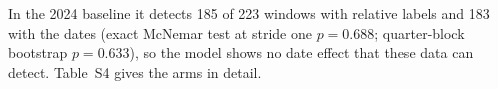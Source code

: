 In the 2024 baseline it detects 185 of 223 windows with relative labels and 183 with the dates (exact McNemar test at stride one $p=0.688$; quarter-block bootstrap $p=0.633$), so the model shows no date effect that these data can detect. Table~S4 gives the arms in detail.
